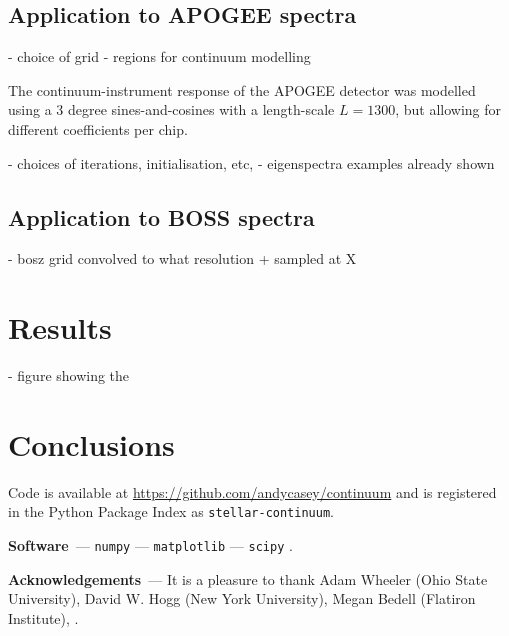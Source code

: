 \documentclass[modern]{aastex631}
\renewcommand{\paragraph}[1]{\medskip\par\noindent\textbf{#1}~---}
\begin{document}
\subsection{Application to APOGEE spectra}

- choice of grid
- regions for continuum modelling

The continuum-instrument response of the APOGEE detector was modelled using a 3 degree sines-and-cosines with a length-scale $L = 1300$, but allowing for different coefficients per chip.

- choices of iterations, initialisation, etc, 
- eigenspectra examples already shown



\subsection{Application to BOSS spectra}

- bosz grid convolved to what resolution + sampled at X


\section{Results}\label{sec:results}

- figure showing the 

\section{Conclusions}\label{sec:conclusions}



Code is available at \url{https://github.com/andycasey/continuum} and is registered in the Python Package Index as \texttt{stellar-continuum}.

\paragraph{Software}
\texttt{numpy} \citep{numpy} ---
\texttt{matplotlib} \citep{matplotlib} ---
\texttt{scipy} \citep{scipy}.

\paragraph{Acknowledgements}
It is a pleasure to thank
    Adam Wheeler (Ohio State University),
    David W. Hogg (New York University),
    Megan Bedell (Flatiron Institute),
.

%
\end{document}
